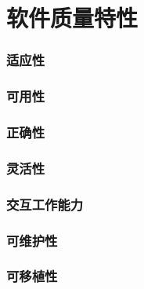 \chapter{软件质量特性}
\subsection{适应性}
\subsection{可用性}
\subsection{正确性}
\subsection{灵活性}
\subsection{交互工作能力}
\subsection{可维护性}
\subsection{可移植性}